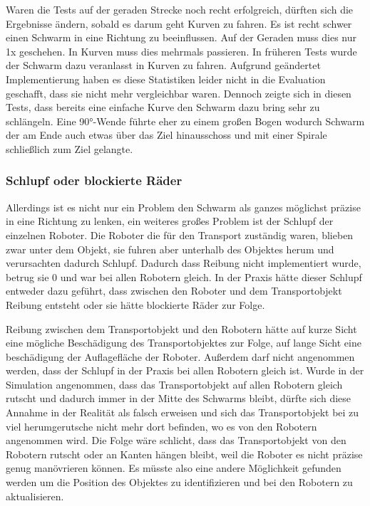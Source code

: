 Waren die Tests auf der geraden Strecke noch recht erfolgreich, dürften sich die Ergebnisse ändern, sobald es darum geht Kurven zu fahren. Es ist recht schwer einen Schwarm in eine Richtung zu beeinflussen. Auf der Geraden muss dies nur 1x geschehen. In Kurven muss dies mehrmals passieren. In früheren Tests wurde der Schwarm dazu veranlasst in Kurven zu fahren. Aufgrund geändertet Implementierung haben es diese Statistiken leider nicht in die Evaluation geschafft, dass sie nicht mehr vergleichbar waren. Dennoch zeigte sich in diesen Tests, dass bereits eine einfache Kurve den Schwarm dazu bring sehr zu schlängeln. Eine 90°-Wende führte eher zu einem großen Bogen wodurch Schwarm der am Ende auch etwas über das Ziel hinausschoss und mit einer Spirale schließlich zum Ziel gelangte.

\subsubsection*{Schlupf oder blockierte Räder}
Allerdings ist es nicht nur ein Problem den Schwarm als ganzes möglichst präzise in eine Richtung zu lenken, ein weiteres großes Problem ist der Schlupf der einzelnen Roboter.
Die Roboter die für den Transport zuständig waren, blieben zwar unter dem Objekt, sie fuhren aber unterhalb des Objektes herum und verursachten dadurch Schlupf. Dadurch dass Reibung nicht implementiert wurde, betrug sie 0 und war bei allen Robotern gleich. In der Praxis hätte dieser Schlupf entweder dazu geführt, dass zwischen den Roboter und dem Transportobjekt Reibung entsteht oder sie hätte blockierte Räder zur Folge.

Reibung zwischen dem Transportobjekt und den Robotern hätte auf kurze Sicht eine mögliche Beschädigung des Transportobjektes zur Folge, auf lange Sicht eine beschädigung der Auflagefläche der Roboter. Außerdem darf nicht angenommen werden, dass der Schlupf in der Praxis bei allen Robotern gleich ist. Wurde in der Simulation angenommen, dass das Transportobjekt auf allen Robotern gleich rutscht und dadurch immer in der Mitte des Schwarms bleibt, dürfte sich diese Annahme in der Realität als falsch erweisen und sich das Transportobjekt bei zu viel herumgerutsche nicht mehr dort befinden, wo es von den Robotern angenommen wird. Die Folge wäre schlicht, dass das Transportobjekt von den Robotern rutscht oder an Kanten hängen bleibt, weil die Roboter es nicht präzise genug manövrieren können. Es müsste also eine andere Möglichkeit gefunden werden um die Position des Objektes zu identifizieren und bei den Robotern zu aktualisieren.

